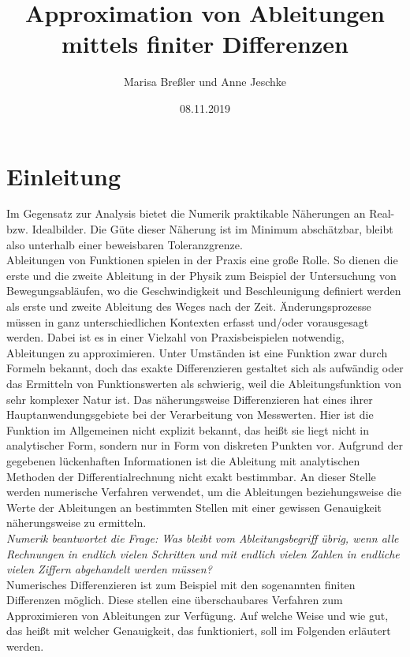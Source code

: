 \documentclass{scrartcl}
\begin{document}
\title{Approximation von Ableitungen\\mittels finiter Differenzen}
\author{Marisa Breßler und Anne Jeschke}
\date{08.11.2019}
\maketitle
\tableofcontents
\pagebreak \section{Einleitung}
\label{sec:einleitung}
Im Gegensatz zur Analysis bietet die Numerik praktikable Näherungen an Real- bzw. Idealbilder. Die Güte dieser Näherung ist im Minimum abschätzbar, bleibt also unterhalb einer beweisbaren Toleranzgrenze. \\
Ableitungen von Funktionen spielen in der Praxis eine große Rolle. So dienen die erste und die zweite Ableitung in der Physik zum Beispiel der Untersuchung von Bewegungsabläufen, wo die Geschwindigkeit und Beschleunigung definiert werden als erste und zweite Ableitung des Weges nach der Zeit. Änderungsprozesse müssen in ganz unterschiedlichen Kontexten erfasst und/oder vorausgesagt werden. Dabei ist es in einer Vielzahl von Praxisbeispielen notwendig, Ableitungen zu approximieren. Unter Umständen ist eine Funktion zwar durch Formeln bekannt, doch das exakte Differenzieren gestaltet sich als aufwändig oder das Ermitteln von Funktionswerten als schwierig, weil die Ableitungsfunktion von sehr komplexer Natur ist. Das näherungsweise Differenzieren hat eines ihrer Hauptanwendungsgebiete bei der Verarbeitung von Messwerten. Hier ist die Funktion im Allgemeinen nicht explizit bekannt, das heißt sie liegt nicht in analytischer Form, sondern nur in Form von diskreten Punkten vor. Aufgrund der gegebenen lückenhaften Informationen ist die Ableitung mit analytischen Methoden der Differentialrechnung nicht exakt bestimmbar. An dieser Stelle werden numerische Verfahren verwendet, um die Ableitungen beziehungsweise die Werte der Ableitungen an bestimmten Stellen mit einer gewissen Genauigkeit näherungsweise zu ermitteln. \\
\linebreak
\textit{Numerik beantwortet die Frage: Was bleibt vom Ableitungsbegriff übrig, wenn alle Rechnungen in endlich vielen Schritten und mit endlich vielen Zahlen in endliche vielen Ziffern abgehandelt werden müssen?}\cite{schneebeli}\\
\linebreak
Numerisches Differenzieren ist zum Beispiel mit den sogenannten finiten Differenzen möglich. Diese stellen eine überschaubares Verfahren zum Approximieren von Ableitungen zur Verfügung. Auf welche Weise und wie gut, das heißt mit welcher Genauigkeit, das funktioniert, soll im Folgenden erläutert werden. \\
\end{document}
